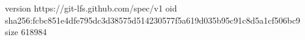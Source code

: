 version https://git-lfs.github.com/spec/v1
oid sha256:fcbc851e4dfe795dc3d38575d514230577f5a619d035b95c91c8d5a1cf506bc9
size 618984

